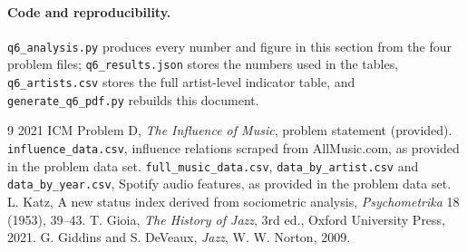 \documentclass[11pt]{article}
\begin{document}
\paragraph{Code and reproducibility.}
\texttt{q6\_analysis.py} produces every number and figure in this section from the four problem
files; \texttt{q6\_results.json} stores the numbers used in the tables, \texttt{q6\_artists.csv}
stores the full artist-level indicator table, and \texttt{generate\_q6\_pdf.py} rebuilds this
document.

\begin{thebibliography}{9}
 2021 ICM Problem D, \emph{The Influence of Music}, problem statement (provided).
 \texttt{influence\_data.csv}, influence relations scraped from AllMusic.com,
as provided in the problem data set.
 \texttt{full\_music\_data.csv}, \texttt{data\_by\_artist.csv} and
\texttt{data\_by\_year.csv}, Spotify audio features, as provided in the problem data set.
 L. Katz, A new status index derived from sociometric analysis,
\emph{Psychometrika} 18 (1953), 39--43.
 T. Gioia, \emph{The History of Jazz}, 3rd ed., Oxford University Press, 2021.
 G. Giddins and S. DeVeaux, \emph{Jazz}, W. W. Norton, 2009.
\end{thebibliography}
\end{document}
